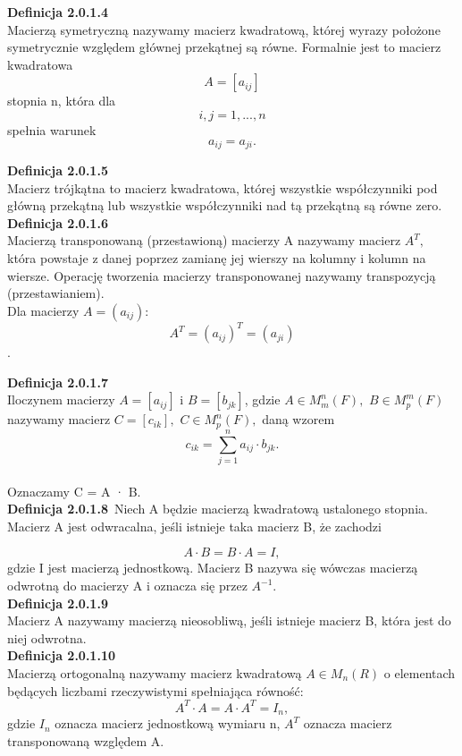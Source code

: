 \documentclass[10pt,a4paper]{report}
\newcommand{\transpose}[1]{{#1}^T}
\begin{document}
\noindent \textbf{Definicja 2.0.1.4}\\
\noindent Macierzą symetryczną nazywamy macierz kwadratową, której wyrazy położone symetrycznie względem głównej przekątnej są równe. Formalnie jest to macierz kwadratowa $$A=[a_{ij}]$$ stopnia n, która dla $$i,j=1,...,n$$ spełnia warunek 
$$
a_{ij}=a_{ji}.
$$

\noindent \textbf{Definicja 2.0.1.5}\\
\noindent Macierz trójkątna to macierz kwadratowa, której wszystkie współczynniki pod główną przekątną lub wszystkie współczynniki nad tą przekątną są równe zero.\\

\noindent \textbf{Definicja 2.0.1.6}\\
\noindent Macierzą transponowaną (przestawioną) macierzy A nazywamy macierz $A^{T},$ która powstaje z danej poprzez zamianę jej wierszy na kolumny i kolumn na wiersze. Operację tworzenia macierzy transponowanej nazywamy transpozycją (przestawianiem).\\
Dla macierzy $A=(a_{ij}):$ 
$$ 
\transpose{A} = \transpose{(a_{ij})}=(a_{ji})
$$.

\noindent \textbf{Definicja 2.0.1.7}\\
\noindent Iloczynem macierzy $A = [a_{ij} ]$ i $B = [b_{jk}]$, gdzie $A\in M_{m}^{n}(F), $ $B\in M_{p}^{m}(F)$ nazywamy macierz $C = [c_{ik}], $ $C \in M_{p}^{n}(F), $ daną wzorem $$ c_{ik} = \sum_{j=1}^{n} a_{ij}\cdot b_{jk}. $$\\
Oznaczamy C = A · B.\\

\noindent \textbf{Definicja 2.0.1.8}\
\noindent Niech A będzie macierzą kwadratową ustalonego stopnia. Macierz A jest odwracalna, jeśli istnieje taka macierz B, że zachodzi

 $$A\cdot B=B\cdot A=I, $$ gdzie I jest macierzą jednostkową. Macierz B nazywa się wówczas macierzą odwrotną do macierzy A i oznacza się przez  $A^{-1}.$\\

\noindent \textbf{Definicja 2.0.1.9}\\
\noindent Macierz A nazywamy macierzą nieosobliwą, jeśli istnieje macierz B, która jest do niej odwrotna.\\  

\noindent \textbf{Definicja 2.0.1.10}\\
\noindent Macierzą ortogonalną nazywamy macierz kwadratową $A\in M_{n}(R)$ o elementach będących liczbami rzeczywistymi spełniająca równość:
$$A^{T}\cdot A=A\cdot A^{T}=I_{n},$$ gdzie $I_{n}$ oznacza macierz jednostkową wymiaru n, $A^{T}$ oznacza macierz transponowaną względem A.\\
\end{document}

